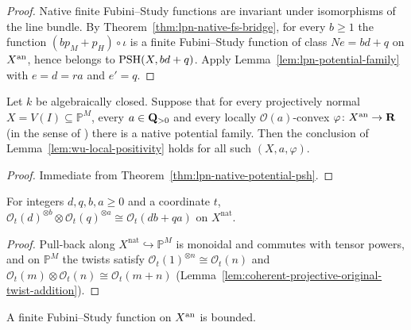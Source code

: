 \begin{proof}
Native finite Fubini--Study functions are invariant under isomorphisms of the line bundle. By
Theorem~\ref{thm:lpn-native-fs-bridge}, for every $b\ge1$ the function $(bp_M+p_H)\circ\iota$ is a finite
Fubini--Study function of class $Ne=bd+q$ on $X^{\mathrm{an}}$, hence belongs to $\operatorname{PSH}(X,bd+q)$. Apply
Lemma~\ref{lem:lpn-potential-family} with $e=d=ra$ and $e'=q$.
\end{proof}

\begin{theorem}\label{thm:lpn-local-positivity}
\leanok
{}
Let $k$ be algebraically closed. Suppose that for every projectively normal $X=V(I)\subseteq\mathbb P^M$, every
$a\in\mathbf{Q}_{>0}$ and every locally $\mathcal O(a)$-convex $\varphi\colon X^{\mathrm{an}}\to\mathbf{R}$ (in the sense of
\cite[Definition~5.3]{FHX}) there is a native potential family. Then the conclusion of
Lemma~\ref{lem:wu-local-positivity} holds for all such $(X,a,\varphi)$.
\end{theorem}

\begin{proof}
Immediate from Theorem~\ref{thm:lpn-native-potential-psh}.
\end{proof}

\begin{lemma}\label{lem:lpn-twist-power-tensor}
\leanok
{}
For integers $d,q,b,a\ge0$ and a coordinate $t$, $\mathcal O_t(d)^{\otimes b}\otimes\mathcal O_t(q)^{\otimes a}\cong
\mathcal O_t(db+qa)$ on $X^{\mathrm{nat}}$.
\end{lemma}

\begin{proof}
Pull-back along $X^{\mathrm{nat}}\hookrightarrow\mathbb P^M$ is monoidal and commutes with tensor powers, and on
$\mathbb P^M$ the twists satisfy $\mathcal O_t(1)^{\otimes n}\cong\mathcal O_t(n)$ and
$\mathcal O_t(m)\otimes\mathcal O_t(n)\cong\mathcal O_t(m+n)$ (Lemma~\ref{lem:coherent-projective-original-twist-addition}).
\end{proof}

\begin{lemma}\label{lem:lpn-finite-fs-bounded}
\leanok
{}
A finite Fubini--Study function on $X^{\mathrm{an}}$ is bounded.
\end{lemma}

